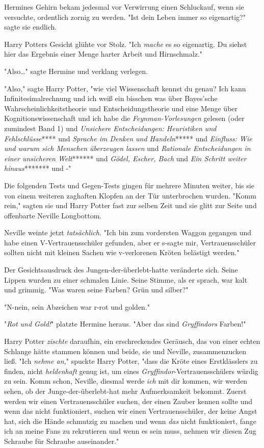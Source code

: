 {Hermines Gehirn bekam jedesmal vor Verwirrung einen Schluckauf, wenn sie versuchte, ordentlich zornig zu werden. "Ist dein Leben immer so eigenartig?" sagte sie endlich.

Harry Potters Gesicht glühte vor Stolz. "Ich \emph{mache} es so eigenartig. Du siehst hier das Ergebnis einer Menge harter Arbeit und Hirnschmalz."

"Also…" sagte Hermine und verklang verlegen.

"Also," sagte Harry Potter, "wie viel Wissenschaft kennst du genau? Ich kann Infinitesimalrechnung und ich weiß ein bisschen was über Bayes'sche Wahrscheinlichkeitstheorie und Entscheidungstheorie und eine Menge über Kognitionswissenschaft und ich habe die \emph{Feynman-Vorlesungen} gelesen (oder zumindest Band 1) und \emph{Unsichere Entscheidungen: Heuristiken und Fehlschlüsse}**** und \emph{Sprache im Denken und Handeln}***** und \emph{Einfluss: Wie und warum sich Menschen überzeugen lassen} und \emph{Rationale Entscheidungen in einer unsicheren Welt}****** und \emph{Gödel, Escher, Bach} und \emph{Ein Schritt weiter hinaus}******* und -"

Die folgenden Tests und Gegen-Tests gingen für mehrere Minuten weiter, bis sie von einem weiteren zaghaften Klopfen an der Tür unterbrochen wurden. "Komm rein," sagten sie und Harry Potter fast zur selben Zeit und sie glitt zur Seite und offenbarte Neville Longbottom.

Neville weinte jetzt \emph{tatsächlich.} "Ich bin zum vordersten Waggon gegangen und habe einen V-Vertrauensschüler gefunden, aber er s-sagte mir, Vertrauensschüler sollten nicht mit kleinen Sachen wie v-verlorenen Kröten belästigt werden."

Der Gesichtsausdruck des Jungen-der-überlebt-hatte veränderte sich. Seine Lippen wurden zu einer schmalen Linie. Seine Stimme, als er sprach, war kalt und grimmig. "Was waren seine Farben? Grün und silber?"

"N-nein, sein Abzeichen war r-rot und golden."

"\emph{Rot und Gold!}" platzte Hermine heraus. "Aber das sind \emph{Gryffindors} Farben!"

Harry Potter \emph{zischte} daraufhin, ein erschreckendes Geräusch, das von einer echten Schlange hätte stammen können und beide, sie und Neville, zusammenzucken ließ. "Ich \emph{nehme an,}" spuckte Harry Potter, "dass die Kröte eines Erstklässlers zu finden, nicht \emph{heldenhaft} genug ist, um eines \emph{Gryffindor}-Vertrauensschülers würdig zu sein. Komm schon, Neville, diesmal werde \emph{ich} mit dir kommen, wir werden sehen, ob der Junge-der-überlebt-hat mehr Aufmerksamkeit bekommt. Zuerst werden wir einen Vertrauensschüler suchen, der einen Zauber kennen sollte und wenn das nicht funktioniert, suchen wir einen Vertrauensschüler, der keine Angst hat, sich die Hände schmutzig zu machen und wenn \emph{das} nicht funktioniert, fange ich an meine Fans zu rekrutieren und wenn es sein muss, nehmen wir diesen Zug Schraube für Schraube auseinander."

}
